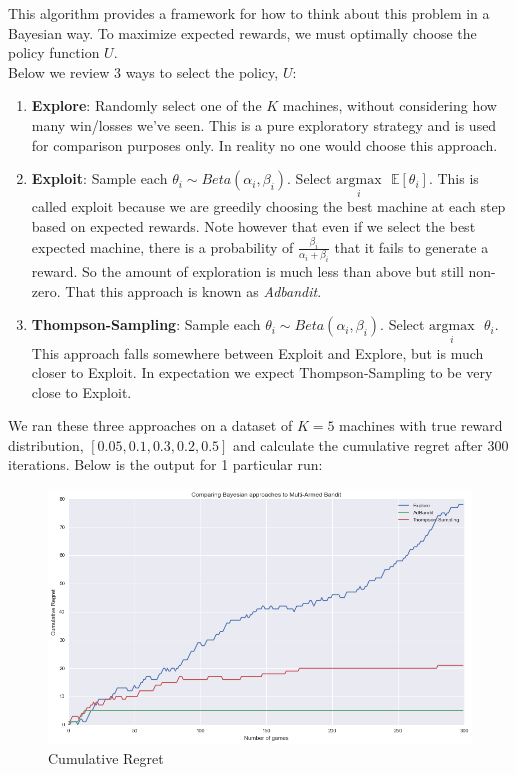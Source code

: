 \documentclass{article}
\begin{document}
This algorithm provides a framework for how to think about this problem in a Bayesian way. To maximize expected rewards, we must optimally choose the policy function $U$.\\

Below we review 3 ways to select the policy, $U$:

\begin{enumerate}
\item \textbf{Explore}: Randomly select one of the $K$ machines, without considering how many win/losses we've seen. This is a pure exploratory strategy and is used for comparison purposes only. In reality no one would choose this approach.
\item \textbf{Exploit}: Sample each $\theta_i \sim Beta(\alpha_i, \beta_i)$. Select $\underset{i}{\text{argmax}}\text{ }\mathbb{E}[\theta_i]$. This is called exploit because we are greedily choosing the best machine at each step based on expected rewards. Note however that even if we select the best expected machine, there is a probability of $\frac{\beta_i}{\alpha_i + \beta_i}$ that it fails to generate a reward. So the amount of exploration is much less than above but still non-zero. That this approach is known as \textit{Adbandit}.
\item \textbf{Thompson-Sampling}: Sample each $\theta_i \sim Beta(\alpha_i, \beta_i)$. Select $\underset{i}{\text{argmax}}\text{ }\theta_i$. This approach falls somewhere between Exploit and Explore, but is much closer to Exploit. In expectation we expect Thompson-Sampling to be very close to Exploit.
\end{enumerate}

We ran these three approaches on a dataset of $K=5$ machines with true reward distribution, $[0.05,0.1,0.3,0.2,0.5]$ and calculate the cumulative regret after 300 iterations. Below is the output for 1 particular run:

\begin{figure}[H]
\centering
\includegraphics[scale=0.4]{thompson_regret.png}
\caption{Cumulative Regret}
\end{figure}
\end{document}
